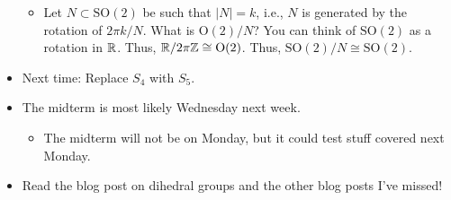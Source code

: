\documentclass[../notes.tex]{subfiles}
\begin{document}
\begin{itemize}
\begin{itemize}
        \item Let $N\subset\text{SO}(2)$ be such that $|N|=k$, i.e., $N$ is generated by the rotation of $2\pi k/N$. What is $\text{O}(2)/N$? You can think of $\text{SO}(2)$ as a rotation in $\mathbb{R}$. Thus, $\mathbb{R}/2\pi\mathbb{Z}\cong\text{O}(2)$. Thus, $\text{SO}(2)/N\cong\text{SO}(2)$.
    \end{itemize}
    \item Next time: Replace $S_4$ with $S_5$.
    \item The midterm is most likely Wednesday next week.
    \begin{itemize}
        \item The midterm will not be on Monday, but it could test stuff covered next Monday.
    \end{itemize}
    \item Read the blog post on dihedral groups and the other blog posts I've missed!
\end{itemize}
\end{document}
